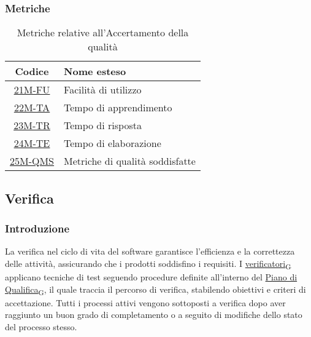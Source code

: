 \subsubsection{Metriche}
\begin{table}[!h]
	\centering
	\begin{tabular}{ | c | l | }
		\hline
		\textbf{Codice}                      & \textbf{Nome esteso}            \\
		\hline
		\underline{\hyperlink{21M}{21M-FU}}  & Facilità di utilizzo            \\
        \underline{\hyperlink{22M}{22M-TA}}  & Tempo di apprendimento          \\
        \underline{\hyperlink{23M}{23M-TR}}  & Tempo di risposta               \\
        \underline{\hyperlink{24M}{24M-TE}}  & Tempo di elaborazione           \\
        \underline{\hyperlink{25M}{25M-QMS}} & Metriche di qualità soddisfatte \\
		\hline
	\end{tabular}
	\caption{Metriche relative all'Accertamento della qualità}
\end{table}

\subsection{Verifica}
\subsubsection{Introduzione}
La verifica nel ciclo di vita del software garantisce l'efficienza e la correttezza delle attività, assicurando che i prodotti soddisfino i requisiti. I \href{https://7last.github.io/docs/rtb/documentazione-interna/glossario\#verificatore}{verificatori\textsubscript{G}} applicano tecniche di test seguendo procedure definite all'interno del \href{https://7last.github.io/docs/rtb/documentazione-interna/glossario\#piano-di-qualifica}{Piano di Qualifica\textsubscript{G}}, il quale traccia il percorso di verifica, stabilendo obiettivi e criteri di accettazione. Tutti i processi attivi vengono sottoposti a verifica dopo aver raggiunto un buon grado di completamento o a seguito di modifiche dello stato del processo stesso.

